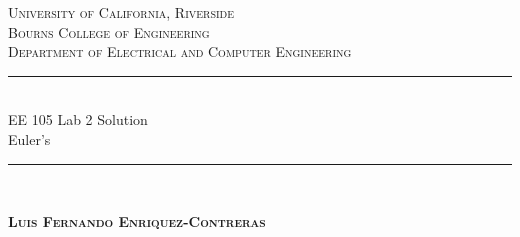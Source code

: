 \documentclass[12pt]{article}
\begin{document}
	\begin{titlepage}
		
		\newcommand{\HRule}{\rule{\linewidth}{0.5mm}} %
		
		\center %
		
		
		\textsc{\LARGE University of California, Riverside}\\[1.5cm] %
		\textsc{\Large Bourns College of Engineering}\\[0.5cm] %
		\textsc{\large Department of Electrical and Computer Engineering}\\[0.5cm] %
		
		
		\HRule \\[0.6cm]
		{\Large EE 105 Lab 2 Solution \\ \normalsize Euler's}\\[0.4cm] %
		\HRule \\[1.0cm]
		
		
		\begin{center} \large
			\medskip
			{\textsc{\textbf{Luis Fernando Enriquez-Contreras} }} 
		\end{center}
		
		
		\begin{center}
			{\large }
		\end{center}
		

\end{titlepage}
\end{document}
